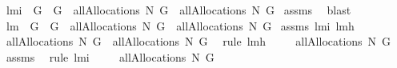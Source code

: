\begin{isabellebody}
%
\endisatagproof
{\isafoldproof}%
%
\isadelimproof
\isanewline
%
\endisadelimproof
\isanewline
{}\isamarkupfalse%
\ lm{}{}i{\isacharcolon}\ \ {\isachardoublequoteopen}G{}\ {\isasymsubseteq}\ G{}{\isachardoublequoteclose}\ \ {\isachardoublequoteopen}allAllocations{\isacharprime}{\isacharprime}{\isacharprime}{\isacharprime}\ N\ G{}\ {\isasymsubseteq}\ allAllocations{\isacharprime}{\isacharprime}{\isacharprime}{\isacharprime}\ N\ G{}{\isachardoublequoteclose}\isanewline
%
\isadelimproof
%
\endisadelimproof
%
\isatagproof
{}\isamarkupfalse%
\ assms\ \isamarkupfalse%
\ blast%
\endisatagproof
{\isafoldproof}%
%
\isadelimproof
\isanewline
%
\endisadelimproof
\isanewline
{}\isamarkupfalse%
\ lm{}{}{\isacharcolon}\ \ {\isachardoublequoteopen}G{}\ {\isasymsubseteq}\ G{}{\isachardoublequoteclose}\ \ {\isachardoublequoteopen}allAllocations{\isacharprime}{\isacharprime}{\isacharprime}\ N\ G{}\ {\isasymsubseteq}\ allAllocations{\isacharprime}{\isacharprime}{\isacharprime}\ N\ G{}{\isachardoublequoteclose}\isanewline
%
\isadelimproof
%
\endisadelimproof
%
\isatagproof
{}\isamarkupfalse%
\ assms\ lm{}{}i\ lm{}{}h\ \isanewline
{}\isamarkupfalse%
\ {\isacharminus}\isanewline
{}\isamarkupfalse%
\ {\isachardoublequoteopen}allAllocations{\isacharprime}{\isacharprime}{\isacharprime}\ N\ G{}\ {\isacharequal}\ allAllocations{\isacharprime}{\isacharprime}{\isacharprime}{\isacharprime}\ N\ G{}{\isachardoublequoteclose}\ \isamarkupfalse%
\ {\isacharparenleft}rule\ lm{}{}h{\isacharparenright}\isanewline
{}\isamarkupfalse%
\ \isamarkupfalse%
\ {\isachardoublequoteopen}{\isachardot}{\isachardot}{\isachardot}\ {\isasymsubseteq}\ allAllocations{\isacharprime}{\isacharprime}{\isacharprime}{\isacharprime}\ N\ G{}{\isachardoublequoteclose}\ \isamarkupfalse%
\ assms{\isacharparenleft}{}{\isacharparenright}\ \isamarkupfalse%
\ {\isacharparenleft}rule\ lm{}{}i{\isacharparenright}\isanewline
{}\isamarkupfalse%
\ \isamarkupfalse%
\ {\isachardoublequoteopen}{\isachardot}{\isachardot}{\isachardot}\ {\isacharequal}\ allAllocations{\isacharprime}{\isacharprime}{\isacharprime}\ N\ G{}{\isachardoublequoteclose}\ \isamarkupfalse%

\end{isabellebody}

